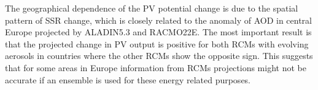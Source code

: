 

The geographical dependence of the PV potential change is due to the spatial pattern of SSR change, which is closely related to the anomaly of AOD in central Europe projected by ALADIN5.3 and RACMO22E. The most important result is that the projected change in PV output is positive for both RCMs with evolving aerosols in countries where the other RCMs show the opposite sign. This suggests that for some areas in Europe information from RCMs projections might not be accurate if an ensemble is used for these energy related purposes.

